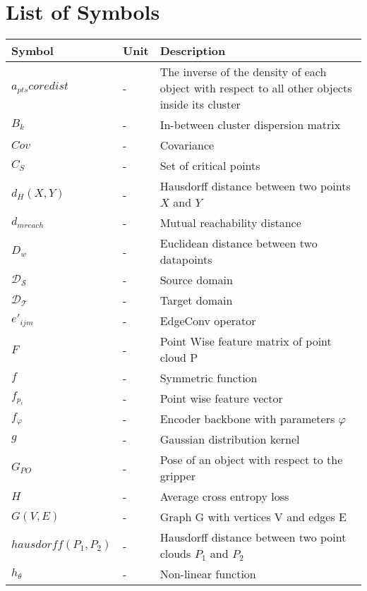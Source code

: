 \section*{List of Symbols}
\begin{table}[H]
    \setlength\extrarowheight{5pt}
    \centering
    \begin{tabular}{|p{70pt}|p{30pt}|p{270pt}|}
      \toprule
      Symbol	& Unit	& Description\\
      \midrule
      $\mathit{a_{pts}coredist}$ & - & The inverse of the density of each object with respect to all other objects inside its cluster  \\
      $\mathit{B_k}$ & - & In-between cluster dispersion matrix \\
      $\mathit{Cov}$ & - & Covariance \\
      $\mathit{C_S}$ & - & Set of critical points \\
      $\mathit{d_H(X,Y)}$ & - & Hausdorff distance between two points $X$ and $Y$ \\
      $\mathit{d_{mreach}}$ & - & Mutual reachability distance \\
      $\mathit{D_w}$ & - & Euclidean distance between two datapoints \\
      $\mathit{\mathcal{D_S}}$ & - & Source domain \\
      $\mathit{\mathcal{D_T}}$ & - & Target domain \\
      $\mathit{e'_{ijm}}$ & - & EdgeConv operator \\
      $F$ & - & Point Wise feature matrix of point cloud P \\
      $\mathit{f}$ & - & Symmetric function \\
      $f_{p_i}$ & - & Point wise feature vector \\
      $f_{\varphi}$ & - & Encoder backbone with parameters $\varphi$ \\
      $\mathit{g}$ & - & Gaussian distribution kernel \\
      $G_{PO}$	& -	& Pose of an object with respect to the gripper \\
      $H$ &- & Average cross entropy loss \\
      $\mathit{G(V,E)}$ & - & Graph G with vertices V and edges E \\
      $\mathit{hausdorff(P_1, P_2)}$ & - & Hausdorff distance between two point clouds $P_1$ and $P_2$ \\
      $h_{\theta}$ & - & Non-linear function \\

\end{tabular}
\end{table}
